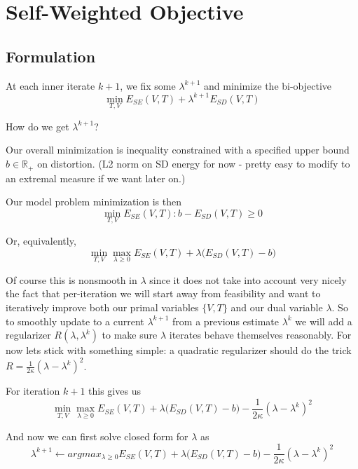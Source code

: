 
\section{Self-Weighted Objective}
\label{sec:self_weighting}
\subsection{Formulation}
At each inner iterate $k+1$, we fix some $\lambda^{k+1}$ and minimize the bi-objective 
\[ \min_{T,V} E_{SE}(V,T) + \lambda^{k+1} E_{SD}(V,T) \]

How do we get $\lambda^{k+1}$? 

Our overall minimization is inequality constrained with a specified upper bound $b \in \mathbb{R}_+$ on distortion. (L2 norm on SD  energy for now - pretty easy to modify to an extremal measure if we want later on.)

Our model problem minimization is then 
\[ \min_{T,V} E_{SE}(V,T) :  b - E_{SD}(V,T) \geq 0 \]

Or, equivalently,
\[ \min_{T,V} \max_{\lambda \geq 0} E_{SE}(V,T) + \lambda \big( E_{SD}(V,T) - b\big) \]

Of course this is nonsmooth in $\lambda$ since it does not take into account very nicely the fact that per-iteration we will start away from feasibility and want to iteratively improve both our primal variables $\{V,T\}$ and our dual variable $\lambda$.  So to smoothly update to a current $\lambda^{k+1}$ from a previous estimate $\lambda^k$ we will add a regularizer $R(\lambda,\lambda^k)$ to make sure $\lambda$ iterates behave themselves reasonably. For now lets stick with something simple: a quadratic regularizer should do the trick  $R =\frac{1}{2\kappa} (\lambda- \lambda^k)^2$. 

For iteration $k+1$ this gives us 
\[ \min_{T,V} \max_{\lambda \geq 0} E_{SE}(V,T) + \lambda \big( E_{SD}(V,T) - b\big) - \frac{1}{2\kappa} (\lambda- \lambda^k)^2 \]

And now we can first solve closed form for $\lambda$ as 
\[ \lambda^{k+1} \leftarrow argmax_{\lambda \geq 0} E_{SE}(V,T) + \lambda \big( E_{SD}(V,T) - b\big) - \frac{1}{2\kappa} (\lambda- \lambda^k)^2 \]

